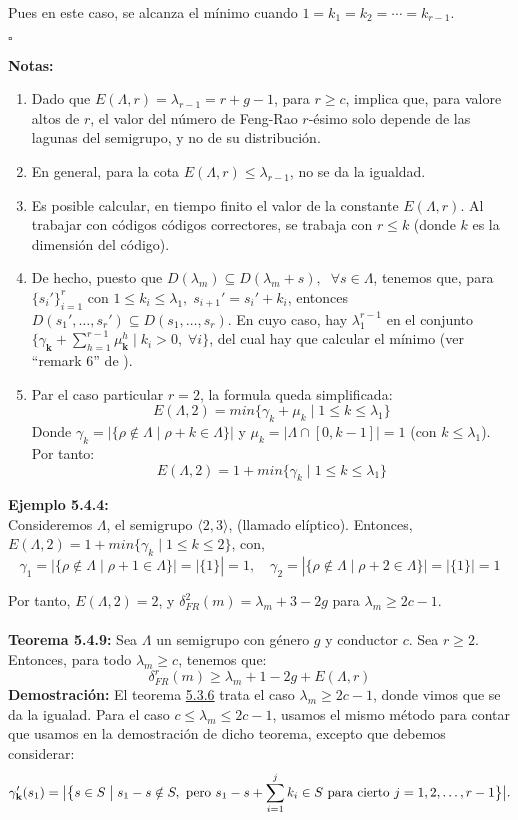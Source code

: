 \documentclass[11pt,spanish]{book}
\newcommand{\qed}{\begin{flushright} $\square$ \end{flushright}}
\newcommand{\FR}[2]{\delta_{FR}^{#1}(#2)}
\newcommand{\fr}{\delta_{FR}^{r}(m)}
\newcommand{\la}{\lambda}
\begin{document}
    Pues en este caso, se alcanza el mínimo cuando $1=k_1=k_2=\cdots=k_{r-1}$.
 \qed 
\textbf{Notas:}
\begin{enumerate}
    \item Dado que $E(\Lambda,r)=\la_{r-1}=r+g-1$, para $r\geq c$, implica que, para valore altos de $r$, el valor del número de Feng-Rao $r$-ésimo solo depende de las lagunas del semigrupo, y no de su distribución.
    \item En general, para la cota $E(\Lambda,r)\leq \la_{r-1}$, no se da la igualdad.
    \item Es posible calcular, en tiempo finito el valor de la constante $E(\Lambda,r)$. Al trabajar con códigos códigos correctores, se trabaja con $r\leq k$ (donde $k$ es la dimensión del código). 
    \item De hecho, puesto que $D(\la_m)\subseteq D(\la_m+s),\;\;\forall s\in \Lambda$, tenemos que, para $\{s_i'\}_{i=1}^{r}$ con $1\leq k_i\leq \la_1,\;s_{i+1}'=s_{i}'+k_i$, entonces $D(s_1',\ldots,s_r')\subseteq D(s_1,\ldots,s_r)$. En cuyo caso, hay $\la_1^{r-1}$ en el conjunto $\{\gamma_{\mathbf{k}}+\sum_{h=1}^{r-1}\mu_{\mathbf{k}}^h\;|\;k_i>0,\;\forall i\}$, del cual hay que calcular el mínimo (ver ``remark $6$'' de \cite{J.I.Farrán}). 
    \item Par el caso particular $r=2$, la formula queda simplificada:
    $$E(\Lambda,2)=min\{\gamma_{k}+\mu_{k}\;|\;1\leq k\leq \la_1\}$$
    Donde $\gamma_{k}=|\{\rho\notin \Lambda\;|\;\rho +k \in \Lambda\}|$ y $\mu_{k}=|\Lambda\cap [0,k-1]|=1$ (con $k\leq \la_1$). Por tanto:
    $$E(\Lambda,2)=1+min\{\gamma_{k}\;|\;1\leq k\leq \la_1\}$$
\end{enumerate}
\textbf{Ejemplo 5.4.4: }\\

Consideremos $\Lambda$, el semigrupo $\langle 2, 3\rangle$, (llamado elíptico). Entonces, $E(\Lambda,2)=1+min\{\gamma_{k}\;|\;1\leq k\leq 2\}$, con,
$$\gamma_1 = |\{\rho\notin \Lambda\;|\; \rho +1\in \Lambda\}|= |\{1\}|=1,\quad \gamma_2 = |\{\rho\notin \Lambda\;|\; \rho +2\in \Lambda\}|= |\{1\}|=1$$

Por tanto, $E(\Lambda,2)=2$, y $\FR{2}{m}=\la_m+3-2g$ para $\la_m\geq 2c-1$.\\
\\ \textbf{Teorema 5.4.9:} Sea $\Lambda$ un semigrupo con género $g$ y conductor $c$. Sea $r\geq 2$. Entonces, para todo $\la_m\geq c$, tenemos que:
$$\fr\geq \la_m+1-2g+E(\Lambda,r)$$
\textbf{Demostración: } El teorema \hyperlink{prop5.4.7}{5.3.6} trata el caso $\la_m\geq 2c-1$, donde vimos que se da la igualad. Para el caso $c\leq \la_m\leq 2c-1$, usamos el mismo método para contar que usamos en la demostración de dicho teorema, excepto que debemos considerar:
$$\gamma_{\mathbf{k}}'(s_1)=\big{|}\big{\{} s\in S\;\big{|}\;s_1-s\notin S,\text{ pero } s_1 - s + \sum_{i=1}^{j}k_i \in S \text{ para cierto }j=1,2,\ldots,r-1\big{\}}\big{|}.$$
\end{document}
